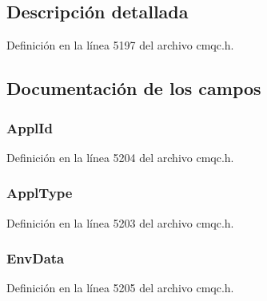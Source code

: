 \subsection{Descripción detallada}


Definición en la línea 5197 del archivo cmqc.\+h.



\subsection{Documentación de los campos}
\hypertarget{structtag_m_q_t_m_c2_a85937497c4f82d120501b04deb4558a8}{}
\subsubsection[{Appl\+Id}]{ Appl\+Id}\label{structtag_m_q_t_m_c2_a85937497c4f82d120501b04deb4558a8}


Definición en la línea 5204 del archivo cmqc.\+h.

\hypertarget{structtag_m_q_t_m_c2_ad1271c6b9978236d19f8c331815ba410}{}
\subsubsection[{Appl\+Type}]{ Appl\+Type}\label{structtag_m_q_t_m_c2_ad1271c6b9978236d19f8c331815ba410}


Definición en la línea 5203 del archivo cmqc.\+h.

\hypertarget{structtag_m_q_t_m_c2_a852305187782d8464d769e32f9267f12}{}
\subsubsection[{Env\+Data}]{ Env\+Data}\label{structtag_m_q_t_m_c2_a852305187782d8464d769e32f9267f12}


Definición en la línea 5205 del archivo cmqc.\+h.

\hypertarget{structtag_m_q_t_m_c2_a45e2a82a9d94471dd5e7f07d814b4bfb}{}
